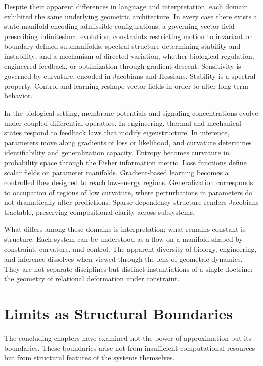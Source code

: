 \documentclass[12pt]{book}
\begin{document}
Despite their apparent differences in language and interpretation,
each domain exhibited the same underlying geometric architecture.
In every case there exists a state manifold encoding admissible
configurations; a governing vector field prescribing infinitesimal
evolution; constraints restricting motion to invariant or
boundary-defined submanifolds; spectral structure determining
stability and instability; and a mechanism of directed variation,
whether biological regulation, engineered feedback, or optimization
through gradient descent. Sensitivity is governed by curvature,
encoded in Jacobians and Hessians. Stability is a spectral property.
Control and learning reshape vector fields in order to alter long-term
behavior.

In the biological setting, membrane potentials and signaling
concentrations evolve under coupled differential operators.
In engineering, thermal and mechanical states respond to feedback laws
that modify eigenstructure. In inference, parameters move along
gradients of loss or likelihood, and curvature determines
identifiability and generalization capacity. Entropy becomes curvature
in probability space through the Fisher information metric. Loss
functions define scalar fields on parameter manifolds. Gradient-based
learning becomes a controlled flow designed to reach low-energy
regions. Generalization corresponds to occupation of regions of low
curvature, where perturbations in parameters do not dramatically alter
predictions. Sparse dependency structure renders Jacobians tractable,
preserving compositional clarity across subsystems.

What differs among these domains is interpretation; what remains
constant is structure. Each system can be understood as a flow on a
manifold shaped by constraint, curvature, and control. The apparent
diversity of biology, engineering, and inference dissolves when viewed
through the lens of geometric dynamics. They are not separate
disciplines but distinct instantiations of a single doctrine: the
geometry of relational deformation under constraint.

\section{Limits as Structural Boundaries}

The concluding chapters have examined not the power of approximation
but its boundaries. These boundaries arise not from insufficient
computational resources but from structural features of the systems
themselves.
\end{document}
